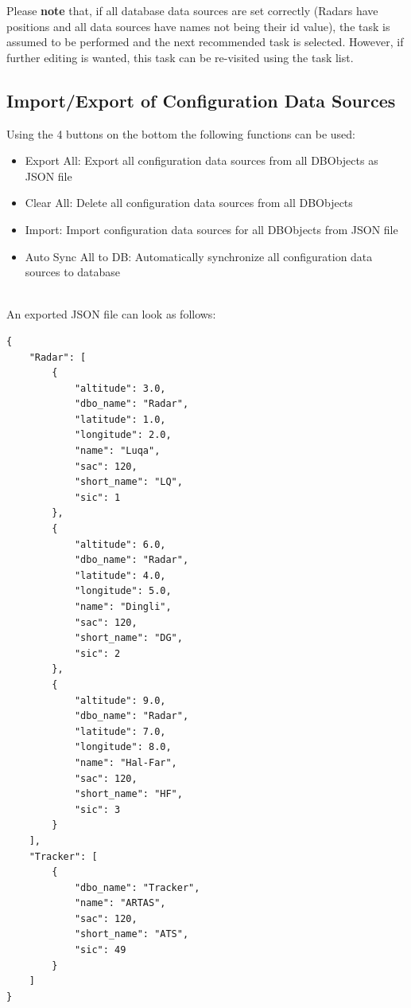 Please \textbf{note} that, if all database data sources are set correctly (Radars have positions and all data sources have names not being their id value), the task is assumed to be performed and the next recommended task is selected. However, if further editing is wanted, this task can be re-visited using the task list.

\subsection{Import/Export of Configuration Data Sources}
\label{sec:config_ds_export}

Using the 4 buttons on the bottom the following functions can be used:

\begin{itemize}  
\item Export All: Export all configuration data sources from all DBObjects as JSON file
\item Clear All: Delete all configuration data sources from all DBObjects
\item Import: Import configuration data sources for all DBObjects from JSON file
\item Auto Sync All to DB: Automatically synchronize all configuration data sources to database
\end{itemize}
\ \\

An exported JSON file can look as follows:

\begin{lstlisting}
{
    "Radar": [
        {
            "altitude": 3.0,
            "dbo_name": "Radar",
            "latitude": 1.0,
            "longitude": 2.0,
            "name": "Luqa",
            "sac": 120,
            "short_name": "LQ",
            "sic": 1
        },
        {
            "altitude": 6.0,
            "dbo_name": "Radar",
            "latitude": 4.0,
            "longitude": 5.0,
            "name": "Dingli",
            "sac": 120,
            "short_name": "DG",
            "sic": 2
        },
        {
            "altitude": 9.0,
            "dbo_name": "Radar",
            "latitude": 7.0,
            "longitude": 8.0,
            "name": "Hal-Far",
            "sac": 120,
            "short_name": "HF",
            "sic": 3
        }
    ],
    "Tracker": [
        {
            "dbo_name": "Tracker",
            "name": "ARTAS",
            "sac": 120,
            "short_name": "ATS",
            "sic": 49
        }
    ]
}
\end{lstlisting}

